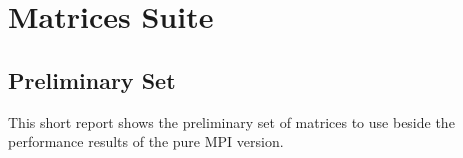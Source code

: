 \section{Matrices Suite} \label{matricesSuite}





\subsection*{Preliminary Set}
This short report shows the preliminary set of matrices to use beside the performance results of the pure MPI version.

\medskip

